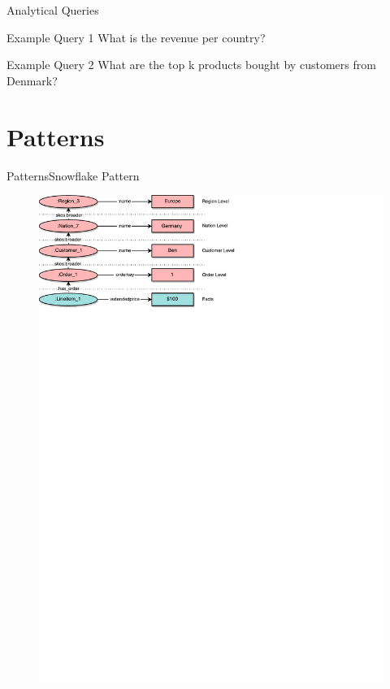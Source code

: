 \begin{frame}{Analytical Queries}
\begin{block}{Example Query 1}
    What is the revenue per country?
\end{block}
\pause
\begin{block}{Example Query 2}
    What are the top k products bought by customers from Denmark?
\end{block}
\end{frame}

\newcommand{\patsec}{Patterns}
\section{\patsec}
\begin{frame}{\patsec}{Snowflake Pattern}
    \begin{figure}
        \includegraphics[trim=0 648 255 0,clip,width=1\textwidth]{images/snowflakepattern.pdf}
    \end{figure}
\end{frame}

